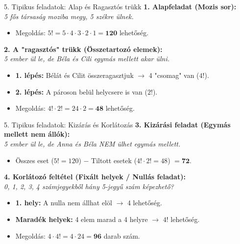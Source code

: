 \documentclass{beamer}
\begin{document}
\begin{frame}{5. Tipikus feladatok: Alap és Ragasztós trükk}
    \small
    \textbf{1. Alapfeladat (Mozis sor):} \\
    \emph{5 fős társaság moziba megy, 5 székre ülnek.}
    \begin{itemize}
        \item Megoldás: $5! = 5 \cdot 4 \cdot 3 \cdot 2 \cdot 1 = \mathbf{120}$ lehetőség.
    \end{itemize}

    \vspace{0.3cm}
    \textbf{2. A "ragasztós" trükk (Összetartozó elemek):} \\
    \emph{5 ember ül le, de Béla és Cili egymás mellett akar ülni.}
    \begin{itemize}
        \item \textbf{1. lépés:} Bélát és Cilit összeragasztjuk $\rightarrow$ 4 "csomag" van ($4!$).
        \item \textbf{2. lépés:} A pároson belül helycsere is van ($2!$).
        \item Megoldás: $4! \cdot 2! = 24 \cdot 2 = \mathbf{48}$ lehetőség.
    \end{itemize}
\end{frame}

\begin{frame}{5. Tipikus feladatok: Kizárás és Korlátozás}
    \small
    \textbf{3. Kizárási feladat (Egymás mellett nem állók):} \\
    \emph{5 ember ül le, de Anna és Béla NEM ülhet egymás mellett.}
    \begin{itemize}
        \item Összes eset ($5! = 120$) $-$ Tiltott esetek ($4! \cdot 2! = 48$) $= \mathbf{72}$.
    \end{itemize}

    \vspace{0.3cm}
    \textbf{4. Korlátozó feltétel (Fixált helyek / Nullás feladat):} \\
    \emph{0, 1, 2, 3, 4 számjegyekből hány 5-jegyű szám képezhető?}
    \begin{itemize}
        \item \textbf{1. hely:} A nulla nem állhat elöl $\rightarrow$ 4 lehetőség.
        \item \textbf{Maradék helyek:} 4 elem marad a 4 helyre $\rightarrow$ $4!$ lehetőség.
        \item Megoldás: $4 \cdot 4! = 4 \cdot 24 = \mathbf{96}$ darab szám.
    \end{itemize}
\end{frame}
\end{document}
